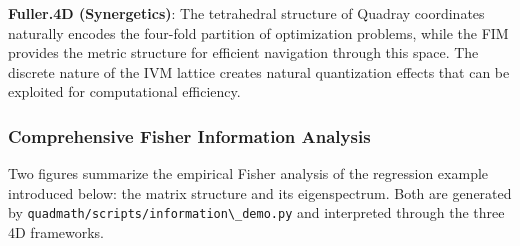 \documentclass[
  10pt,
]{article}
\newcommand{\passthrough}[1]{#1}
\begin{document}
\textbf{Fuller.4D (Synergetics)}: The tetrahedral structure of Quadray
coordinates naturally encodes the four-fold partition of optimization
problems, while the FIM provides the metric structure for efficient
navigation through this space. The discrete nature of the IVM lattice
creates natural quantization effects that can be exploited for
computational efficiency.

\subsubsection{Comprehensive Fisher Information
Analysis}\label{comprehensive-fisher-information-analysis}

Two figures summarize the empirical Fisher analysis of the regression
example introduced below: the matrix structure and its eigenspectrum.
Both are generated by
\passthrough{\lstinline!quadmath/scripts/information\_demo.py!} and
interpreted through the three 4D frameworks.
\end{document}
